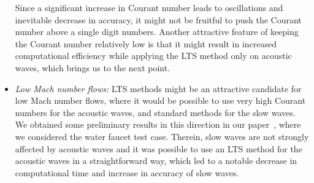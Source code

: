 \begin{itemize}
Since a significant increase in Courant number leads to oscillations and inevitable decrease in accuracy, it might not be fruitful to push the Courant number above a single digit numbers. Another attractive feature of keeping the Courant number relatively low is that it might result in increased computational efficiency while applying the LTS method only on acoustic waves, which brings us to the next point.

\item \textit{Low Mach number flows:} LTS methods might be an attractive candidate for low Mach number flows, where it would be possible to use very high Courant numbers for the acoustic waves, and standard methods for the slow waves. We obtained some preliminary results in this direction in our paper~\cite{jp1}, where we considered the water faucet test case. Therein, slow waves are not strongly affected by acoustic waves and it was possible to use an LTS method for the acoustic waves in a straightforward way, which led to a notable decrease in computational time and increase in accuracy of slow waves. 

\end{itemize}
